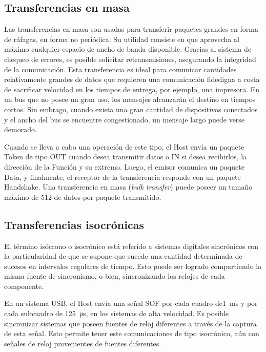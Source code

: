 \subsection{Transferencias en masa}
	Las transferencias en masa son usadas para transferir paquetes grandes en forma de ráfagas, en forma no periódica. Su utilidad consiste en que aprovecha al máximo cualquier espacio de ancho de banda disponible. Gracias al sistema de chequeo de errores, es posible solicitar retransmisiones, asegurando la integridad de la comunicación. Esta transferencia es ideal para comunicar cantidades relativamente grandes de datos que requieren una comunicación fidedigna a costa de sacrificar velocidad en los tiempos de entrega, por ejemplo, una impresora. En un bus que no posee un gran uso, los mensajes alcanzarán el destino en tiempos cortos. Sin embrago, cuando exista una gran cantidad de dispositivos conectados y el ancho del bus se encuentre congestionado, un mensaje largo puede verse demorado.%

	Cuando se lleva a cabo una operación de este tipo, el Host envía un paquete Token de tipo OUT cuando desea transmitir datos o IN si desea recibirlos, la dirección de la Función y su extremo. Luego, el emisor comunica un paquete Data, y finalmente, el receptor de la transferencia responde con un paquete Handshake. Una transferencia en masa ({\it bulk transfer}) puede poseer un tamaño máximo de \SI{512}{\byte} de datos por paquete transmitido.
	
\subsection{Transferencias isocrónicas}
	El término isócrono o isocrónico está referido a sistemas digitales sincrónicos con la particularidad de que se supone que sucede una cantidad determinada de sucesos en intervalos regulares de tiempo. Esto puede ser logrado compartiendo la misma fuente de sincronismo, o bien, sincronizando los relojes de cada componente. 
	
	En un sistema USB, el Host envía una señal SOF por cada cuadro de\SI{1}{\milli\second} y por cada subcuadro de  \SI{125}{\micro\second}, en los sistemas de alta velocidad. Es posible sincronizar sistemas que poseen fuentes de reloj diferentes a través de la captura de esta señal. Esto permite tener este comunicaciones de tipo isocrónico, aún con señales de reloj provenientes de fuentes diferentes.%
	
